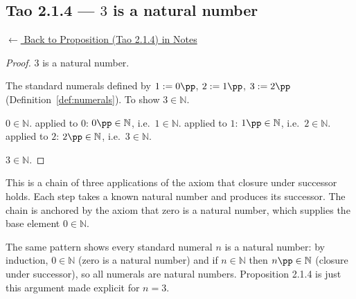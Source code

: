
\subsection*{Tao 2.1.4 --- $3$ is a natural number}
\label{prf:tao-2-1-4}

\begin{remark*}[Return]
\hyperref[prop:tao-2-1-4]{$\leftarrow$ Back to Proposition (Tao 2.1.4) in Notes}
\end{remark*}

\begin{proof}
\Claim $3$ is a natural number.

\Given The standard numerals defined by $1 := 0\pp$, $2 := 1\pp$, $3 := 2\pp$
(Definition~\ref{def:numerals}).
\Goal To show $3 \in \mathbb{N}$.

 $0 \in \mathbb{N}$.
 applied to $0$: $0\pp \in \mathbb{N}$, i.e.\ $1 \in \mathbb{N}$.
 applied to $1$: $1\pp \in \mathbb{N}$, i.e.\ $2 \in \mathbb{N}$.
 applied to $2$: $2\pp \in \mathbb{N}$, i.e.\ $3 \in \mathbb{N}$.

\Hence $3 \in \mathbb{N}$. \AsReq
\end{proof}

\begin{remark*}
This is a chain of three applications of the axiom that closure under successor
holds. Each step takes a known natural number and produces its successor.
The chain is anchored by the axiom that zero is a natural number,
which supplies the base element $0 \in \mathbb{N}$.
\end{remark*}

\begin{remark*}[Generalisation]
The same pattern shows every standard numeral $n$ is a natural number:
by induction, $0 \in \mathbb{N}$ (zero is a natural number) and if $n \in \mathbb{N}$
then $n\pp \in \mathbb{N}$ (closure under successor), so all numerals are natural
numbers. Proposition 2.1.4 is just this argument made explicit for $n = 3$.
\end{remark*}
